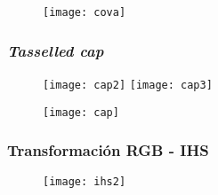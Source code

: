 \documentclass[14pt]{beamer}
\begin{document}
\begin{frame}
  \begin{figure}
    \centering
    \texttt{[image: cova]}
  \end{figure}
\tiny{}
\end{frame}
\begin{frame}
\frametitle{\emph{Tasselled cap}}
  \begin{figure}
    \centering
    \texttt{[image: cap2]}
     \texttt{[image: cap3]}
  \end{figure}
\tiny{}
\end{frame}
\begin{frame}
  \begin{figure}
    \centering
    \texttt{[image: cap]}
  \end{figure}
\tiny{}
\end{frame}
\begin{frame}
\frametitle{Transformación RGB - IHS}
  \begin{figure}
    \centering
    \texttt{[image: ihs2]}
  \end{figure}
\tiny{}
\end{frame}
\end{document}
